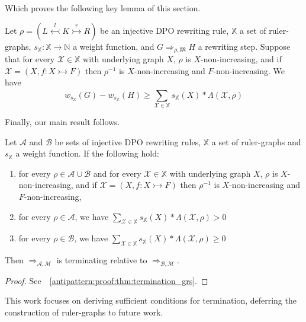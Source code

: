 Which proves the following key lemma of this section.
\begin{lemma}
    \label{antipattern:lem:w_g_geq_w_h_leq}
    Let $\rho = (L \overset{l}{\leftarrowtail} K \overset{r}{\rightarrowtail} R)$ be an injective DPO rewriting rule,
    \( \mathbb{X} \) a set of ruler-graphs,
    \( s_{\mathbb{X}} \colon \mathbb{X} \to \mathbb{N} \) a weight function,
    and \( G \Rightarrow_{\rho,\mathfrak{M}} H \) a rewriting step. 
    Suppose that for every \( \mathcal{X} \in \mathbb{X} \) with underlying graph $X$, 
    $\rho$ is $X$-non-increasing, and if $\mathcal{X}= (X,f:X \rightarrowtail F)$ then $\rho^{-1}$ is $X$-non-increasing and $F$-non-increasing. We have
     $$
        w_{s_\mathbb{X}}(G) - w_{s_\mathbb{X}}(H) 
        \geq 
        \sum_{\mathcal{X} \in \mathbb{X}}^{}s_\mathbb{X}(X) * \Lambda(\mathcal{X},\rho)
    $$
\end{lemma}
Finally, our main result follows.
\begin{theorem}[Termination] 
    \label{antipattern:thm:termination_grs} 
    Let \(\mathcal{A}\) and \(\mathcal{B}\) be sets of injective DPO rewriting rules, $\mathbb{X}$ a set of ruler-graphs and $s_\mathbb{X}$ a weight function. If the following hold:
    \begin{enumerate}
        \item  for every $\rho \in \mathcal{A} \cup \mathcal{B}$ and for every \( \mathcal{X} \in \mathbb{X} \) with underlying graph $X$, 
        $\rho$ is $X$-non-increasing, and if $\mathcal{X}= (X,f:X \rightarrowtail F)$ then $\rho^{-1}$ is $X$-non-increasing and $F$-non-increasing,
        \item for every \(\rho \in \mathcal{A}\), we have
        $ \sum_{\mathcal{X} \in \mathbb{X}}^{}s_\mathbb{X}(X) * 
            \Lambda(\mathcal{X},\rho) > 0 $
        \item for every \(\rho \in \mathcal{B}\), we have   
        $ 
            \sum_{\mathcal{X} \in \mathbb{X}}^{}s_\mathbb{X}(X) * \Lambda(\mathcal{X},\rho) \geq 0 
        $
    \end{enumerate}
    Then \(\Rightarrow_{\mathcal{A},\mathcal{M}}\) is terminating relative to \(\Rightarrow_{\mathcal{B},\mathcal{M}}\).
\end{theorem}
\begin{proof}
    See~\textsection~\ref{antipattern:proof:thm:termination_grs}.
\end{proof}
\begin{remark}
    This work focuses on deriving sufficient conditions for termination, deferring the construction of ruler-graphs to future work.
\end{remark} 